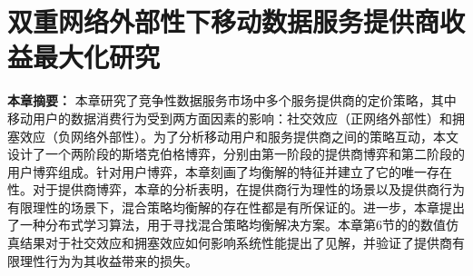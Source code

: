 \chapter{双重网络外部性下移动数据服务提供商收益最大化研究}

\textbf{本章摘要：} 
本章研究了竞争性数据服务市场中多个服务提供商的定价策略，其中移动用户的数据消费行为受到两方面因素的影响：社交效应（正网络外部性）和拥塞效应（负网络外部性）。为了分析移动用户和服务提供商之间的策略互动，本文设计了一个两阶段的斯塔克伯格博弈，分别由第一阶段的提供商博弈和第二阶段的用户博弈组成。针对用户博弈，本章刻画了均衡解的特征并建立了它的唯一存在性。对于提供商博弈，本章的分析表明，在提供商行为理性的场景以及提供商行为有限理性的场景下，混合策略均衡解的存在性都是有所保证的。进一步，本章提出了一种分布式学习算法，用于寻找混合策略均衡解决方案。本章第6节的的数值仿真结果对于社交效应和拥塞效应如何影响系统性能提出了见解，并验证了提供商有限理性行为为其收益带来的损失。


